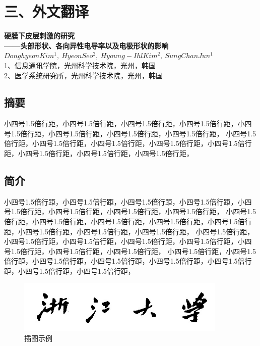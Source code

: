 \section{三、外文翻译}
\begin{spacing}{1.5}
    \begin{center}
        \textbf{硬膜下皮层刺激的研究} \\
        \textbf{——头部形状、各向异性电导率以及电极形状的影响}\\
        $Donghyeon Kim^1,~Hyeon Seo^2,~Hyoung-Ihl Kim^2,~Sung Chan Jun^1$\\
        1、信息通讯学院，光州科学技术院，光州，韩国\\
        2、医学系统研究所，光州科学技术院，光州，韩国\\
    \end{center}

    \subsection*{摘要}
     \hwfs \setlength{\parindent}{2em}
    小四号1.5倍行距，小四号1.5倍行距，小四号1.5倍行距，小四号1.5倍行距，小四号1.5倍行距，小四号1.5倍行距，小四号1.5倍行距，小四号1.5倍行距，
    小四号1.5倍行距，小四号1.5倍行距，小四号1.5倍行距，小四号1.5倍行距，小四号1.5倍行距，小四号1.5倍行距，小四号1.5倍行距，小四号1.5倍行距，    
    \subsection*{简介}

    小四号1.5倍行距，小四号1.5倍行距，小四号1.5倍行距，小四号1.5倍行距，小四号1.5倍行距，小四号1.5倍行距，小四号1.5倍行距，小四号1.5倍行距，
    小四号1.5倍行距，小四号1.5倍行距，小四号1.5倍行距，小四号1.5倍行距，小四号1.5倍行距，小四号1.5倍行距，小四号1.5倍行距，小四号1.5倍行距，
    小四号1.5倍行距，小四号1.5倍行距，小四号1.5倍行距，小四号1.5倍行距，小四号1.5倍行距，小四号1.5倍行距，小四号1.5倍行距，小四号1.5倍行距，
    小四号1.5倍行距，小四号1.5倍行距，小四号1.5倍行距，小四号1.5倍行距，小四号1.5倍行距，小四号1.5倍行距，小四号1.5倍行距，小四号1.5倍行距，


    \begin{figure}[h]
        \begin{center}
        \includegraphics[width=10cm]{ktpics/c1.jpg} 
        \caption{插图示例}
        \end{center}
    \end{figure}
\end{spacing}
\newpage